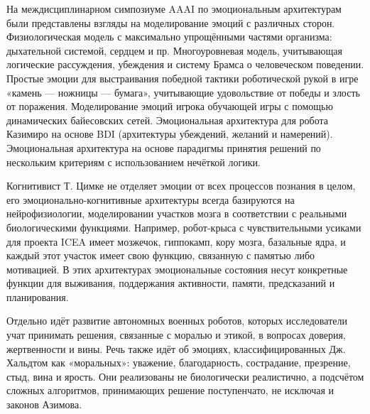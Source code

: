 На междисциплинарном симпозиуме AAAI по эмоциональным архитектурам были представлены взгляды на моделирование эмоций с различных сторон. Физиологическая модель с максимально упрощёнными частями организма: дыхательной системой, сердцем и пр.\cite{aaai1} Многоуровневая модель, учитывающая логические рассуждения, убеждения и систему Брамса о человеческом поведении.\cite{aaai2} Простые эмоции для выстраивания победной тактики роботической рукой в игре «камень — ножницы — бумага», учитывающие удовольствие от победы и злость от поражения.\cite{aaai3} Моделирование эмоций игрока обучающей игры с помощью динамических байесовских сетей.\cite{aaai4} Эмоциональная архитектура для робота Казимиро на основе BDI (архитектуры убеждений, желаний и намерений).\cite{aaai5} Эмоциональная архитектура на основе парадигмы принятия решений по нескольким критериям с использованием нечёткой логики.\cite{aaai6}


Когнитивист Т. Цимке не отделяет эмоции от всех процессов познания в целом, его эмоционально-когнитивные архитектуры всегда базируются на нейрофизиологии, моделировании участков мозга в соответствии с реальными биологическими функциями. Например, робот-крыса с чувствительными усиками для проекта ICEA имеет мозжечок, гиппокамп, кору мозга, базальные ядра, и каждый этот участок имеет свою функцию, связанную с памятью либо мотивацией. В этих архитектурах эмоциональные состояния несут конкретные функции для выживания, поддержания активности, памяти, предсказаний и планирования.\cite{ziemkeflexibility}


Отдельно идёт развитие автономных военных роботов, которых исследователи учат принимать решения, связанные с моралью и этикой, в вопросах доверия, жертвенности и вины.\cite{moralrobots} Речь также идёт об эмоциях, классифицированных Дж. Хальдтом как «моральных»: уважение, благодарность, сострадание, презрение, стыд, вина и ярость.\cite{moralemo} Они реализованы не биологически реалистично, а подсчётом сложных алгоритмов, принимающих решение поступенчато, не исключая и законов Азимова.\cite{militaryrobotics}